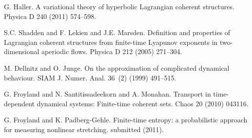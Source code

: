 
\begin{thebibliography}{10}

{\sc G. Haller}. {A variational theory of hyperbolic Lagrangian coherent structures}. Physica D 240 (2011) 574--598.



{\sc S.C. Shadden and F. Lekien and J.E. Marsden}. {Definition and properties of   {L}agrangian coherent structures from finite-time {L}yapunov exponents in two-dimensional aperiodic flows}. Physica D 212 (2005) 271--304.



{\sc M. Dellnitz and O. Junge}. {On the approximation of complicated dynamical behaviour}. SIAM J. Numer. Anal. 36~(2) (1999) 491--515.



{\sc G. Froyland and N. Santitissadeekorn and A. Monahan}. {Transport in time-dependent dynamical systems: Finite-time coherent sets}. Chaos 20 (2010) 043116.



{\sc G. Froyland and K. Padberg-Gehle}. {Finite-time entropy: a probabilistic approach for measuring nonlinear stretching}. submitted (2011).

\end{thebibliography}
